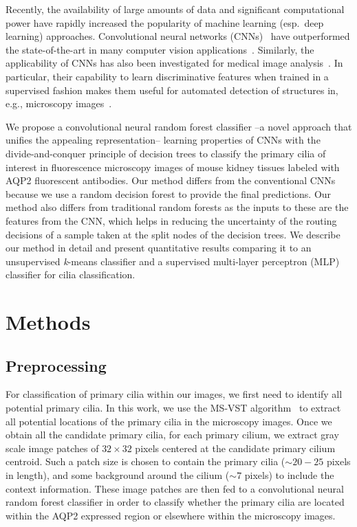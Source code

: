Recently, the availability of large amounts of data and significant computational power have rapidly increased the popularity of machine learning (esp.\ deep learning) approaches. Convolutional neural networks (CNNs)~\cite{lecun_Deeplearning_2015} have outperformed the state-of-the-art in many computer vision applications~\cite{krizhevsky_Imagenet_2017}. Similarly, the applicability of CNNs has also been investigated for medical image analysis~\cite{gupta_Convolutional_2017}. In particular, their capability to learn discriminative features when trained in a supervised fashion makes them useful for automated detection of structures in, e.g., microscopy images~\cite{gupta_Convolutional_2017}.

We propose a convolutional neural random forest classifier --a novel approach that unifies the appealing representation-- learning properties of CNNs with the divide-and-conquer principle of decision trees to classify the primary cilia of interest in fluorescence microscopy images of mouse kidney tissues labeled with AQP2 fluorescent antibodies. Our method differs from the conventional CNNs because we use a random decision forest to provide the final predictions. Our method also differs from traditional random forests as the inputs to these are the features from the CNN, which helps in reducing the uncertainty of the routing decisions of a sample taken at the split nodes of the decision trees. We describe our method in detail and present quantitative results comparing it to an unsupervised \emph{k}-means classifier and a supervised multi-layer perceptron (MLP) classifier for cilia classification.
\pagebreak

\section{Methods}
\subsection{Preprocessing}
For classification of primary cilia within our images, we first need to identify all potential primary cilia. In this work, we use the MS-VST algorithm~\cite{bozhang_Wavelets_2008} to extract all potential locations of the primary cilia in the microscopy images. Once we obtain all the candidate primary cilia, for each primary cilium, we extract gray scale image patches of $32 \times 32$ pixels centered at the candidate primary cilium centroid. Such a patch size is chosen to contain the primary cilia ($\sim20-25$ pixels in length), and some background around the cilium ($\sim7$ pixels) to include the context information. These image patches are then fed to a convolutional neural random forest classifier in order to classify whether the primary cilia are located within the AQP2 expressed region or elsewhere within the microscopy images.

